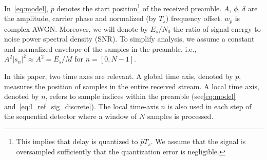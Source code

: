 In~\eqref{eq:model}, $\bar{p}$ denotes the start
position\footnote{This implies that delay is quantized to
  $\bar{p}T_s$. We assume that the signal is oversampled sufficiently
  that the quantization error is negligible.} of the received preamble.
$A$, $\phi$, $\delta$ are the amplitude, carrier phase and normalized
(by $T_s$)
frequency offset.
$w_p$ is complex AWGN.\@
Moreover, we will denote by $E_s/N_0$ the ratio of signal energy to noise power spectral density (SNR).
To simplify analysis, we assume a constant and normalized envelope of the samples in the 
preamble, i.e., $A^2|s_n|^2\approx A^2=E_s/M$ for $n=[0,N-1]$.

In this paper, two time axes are relevant. A global time axis, denoted
by $p$, measures the position of samples in the entire received
stream. A local time axis, denoted by $n$, refers to sample indices
within the preamble (see\eqref{eq:model}
and~\eqref{eq:l_ref_sig_discrete}).
The local time-axis $n$ is also used in each step of the sequential
detector where a window of $N$ samples is processed.




